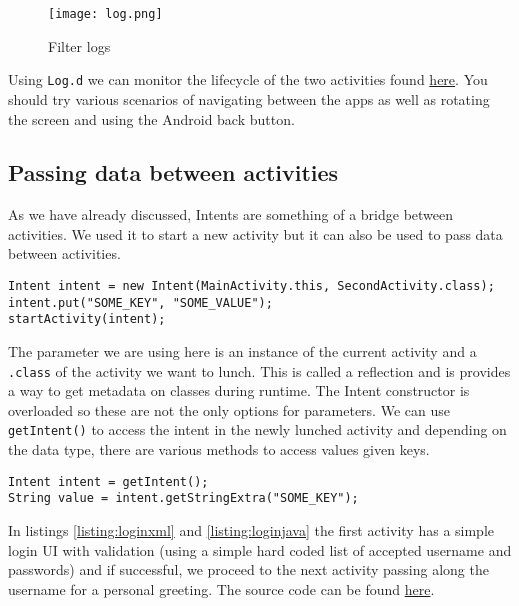 \begin{figure}[H]
\centering
\texttt{[image: log.png]}
\caption{Filter logs}
\label{fig:logfilt}
\end{figure}

Using \texttt{Log.d} we can monitor the lifecycle of the two activities found \href{https://github.com/JonSteinn/AndroidDevelopment/tree/master/examples/lab3/lifecycle}{here}. You should try various scenarios of navigating between the apps as well as rotating the screen and using the Android back button.

\subsection{Passing data between activities}
As we have already discussed, Intents are something of a bridge between activities. We used it to start a new activity but it can also be used to pass data between activities.

\begin{lstlisting}[style=A_Java]
Intent intent = new Intent(MainActivity.this, SecondActivity.class);
intent.put("SOME_KEY", "SOME_VALUE");
startActivity(intent);
\end{lstlisting}

The parameter we are using here is an instance of the current activity and a \texttt{.class} of the activity we want to lunch. This is called a reflection and is provides a way to get metadata on classes during runtime. The Intent constructor is overloaded so these are not the only options for parameters. We can use \texttt{getIntent()} to access the intent in the newly lunched activity and depending on the data type, there are various methods to access values given keys.

\begin{lstlisting}[style=A_Java]
Intent intent = getIntent();
String value = intent.getStringExtra("SOME_KEY");
\end{lstlisting}

In listings \ref{listing:loginxml} and \ref{listing:loginjava} the first activity has a simple login UI with validation (using a simple hard coded list of accepted username and passwords) and if successful, we proceed to the next activity passing along the username for a personal greeting. The source code can be found \href{https://github.com/JonSteinn/AndroidDevelopment/tree/master/examples/lab3/login}{here}.

